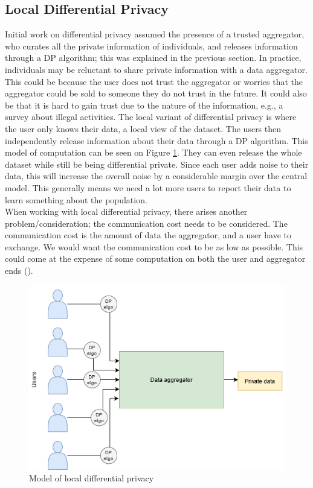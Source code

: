 \documentclass[11pt]{article}
\theoremstyle{definition}
\begin{document}
\subsection{Local Differential Privacy}\label{teo_local}
Initial work on differential privacy assumed the presence of a trusted aggregator, who curates all the private information of individuals, and releases information through a DP algorithm; this was explained in the previous section.  In practice, individuals may be reluctant to share private information with a data aggregator. This could be because the user does not trust the aggregator or worries that the aggregator could be sold to someone they do not trust in the future. It could also be that it is hard to gain trust due to the nature of the information, e.g., a survey about illegal activities. The local variant of differential privacy is where the user only knows their data, a local view of the dataset. The users then independently release information about their data through a DP algorithm. This model of computation can be seen on Figure \ref{fig:model_local_dp}. They can even release the whole dataset while still be being differential private. Since each user adds noise to their data, this will increase the overall noise by a considerable margin over the central model. This generally means we need a lot more users to report their data to learn something about the population. \\

When working with local differential privacy, there arises another problem/consideration; the communication cost needs to be considered. The communication cost is the amount of data the aggregator, and a user have to exchange. We would want the communication cost to be as low as possible. This could come at the expense of some computation on both the user and aggregator ends (\cite[3]{local}).
\begin{figure}[H]
    \centering
    \includegraphics[width = .8\textwidth]{figures/DP_local.png}
    \caption{Model of local differential privacy}
    \label{fig:model_local_dp}
\end{figure}
\end{document}
